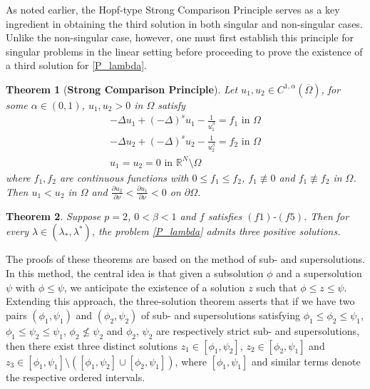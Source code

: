 \documentclass[reqno,oneside]{amsart}
\newtheorem{theorem}{Theorem}[section]
\theoremstyle{definition}
\theoremstyle{remark}
\numberwithin{equation}{section}
\newcommand{\la} {\lambda}
\newcommand{\ba}{\beta}
\newcommand{\Om} {\Omega}
\newcommand{\pa}{\partial}
\newcommand{\bdry}{\mathbb{R}^N \setminus \Omega}
\newcommand{\De} {\Delta}
\begin{document}
As noted earlier, the Hopf-type Strong Comparison Principle serves as a key ingredient in obtaining the third solution in both singular and non-singular cases. Unlike the non-singular case, however, one must first establish this principle for singular problems in the linear setting before proceeding to prove the existence of a third solution for \eqref{P_lambda}.

\begin{theorem}[\textbf{Strong Comparison Principle}]\label{Hopf lemma_linear case}
    Let $u_1, u_2 \in C^{1,\alpha}(\overline{\Om})$, for some $\alpha\in(0,1)$, $u_1, u_2 > 0$ in $\Om$ satisfy 
    \begin{equation}\label{scp_equns}
        \begin{aligned}
            -\Delta u_1 + (-\De)^s u_1 - \frac{1}{u_1^{\ba}} = f_1 \text{ in } \Om\\
            -\Delta u_2 + (-\De)^s u_2 - \frac{1}{u_2^{\ba}} = f_2 \text{ in } \Om\\
            u_1 =u_2 =0 \text{ in } \bdry
        \end{aligned}
    \end{equation}
    where $f_1,f_2$ are continuous functions with $0 \leq f_1 \leq f_2$, $f_1 \not\equiv 0$ and $f_1 \not\equiv f_2$ in $\Om$. Then $u_1 < u_2$ in $\Om$ and $\frac{\pa u_2}{\pa\nu} < \frac{\pa u_1}{\pa\nu} < 0$ on $\pa\Om$.
\end{theorem}

\begin{theorem}\label{theorem_3}
    Suppose $p=2$, $0<\ba<1$ and $f$ satisfies $(f1)$-$(f5)$. Then for every $\la\in (\la_* , \la^*)$, the problem \eqref{P_lambda} admits three positive solutions.
\end{theorem}

The proofs of these theorems are based on the method of sub- and supersolutions. In this method, the central idea is that given a subsolution $\phi$ and a supersolution $\psi$ with $\phi \leq \psi$, we anticipate the existence of a solution $z$ such that $\phi \leq z\leq \psi$. Extending this approach, the three-solution theorem asserts that if we have two pairs $(\phi_1,\psi_1)$ and $(\phi_2,\psi_2)$ of sub- and supersolutions satisfying $\phi_1 \leq \phi_2 \leq \psi_1$, $\phi_1 \leq \psi_2 \leq \psi_1$, $\phi_2 \not\leq \psi_2$ and $\phi_2$, $\psi_2$ are respectively strict sub- and supersolutions, then there exist three distinct solutions $z_1 \in \left[\phi_1, \psi_2\right]$, $z_2 \in \left[\phi_2, \psi_1\right]$ and $z_3 \in \left[\phi_1,\psi_1\right]\setminus \left( \left[\phi_1,\psi_2\right] \cup \left[\phi_2,\psi_1\right] \right)$, where $[\phi_1, \psi_1]$ and similar terms denote the respective ordered intervals.
\end{document}
